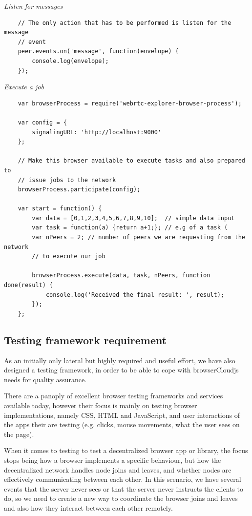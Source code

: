 \textit{Listen for messages}
\begingroup
\scriptsize
\begin{verbatim}
    // The only action that has to be performed is listen for the message 
    // event
    peer.events.on('message', function(envelope) {
        console.log(envelope);
    });
\end{verbatim}
\endgroup

\textit{Execute a job}
\begingroup
\scriptsize
\begin{verbatim}
    var browserProcess = require('webrtc-explorer-browser-process');

    var config = {
        signalingURL: 'http://localhost:9000'
    };

    // Make this browser available to execute tasks and also prepared to 
    // issue jobs to the network
    browserProcess.participate(config);

    var start = function() {
        var data = [0,1,2,3,4,5,6,7,8,9,10];  // simple data input
        var task = function(a) {return a+1;}; // e.g of a task (
        var nPeers = 2; // number of peers we are requesting from the network
        // to execute our job

        browserProcess.execute(data, task, nPeers, function done(result) {
            console.log('Received the final result: ', result);
        });
    };
\end{verbatim}
\endgroup

\subsection{Testing framework requirement}

As an initially only lateral but highly required and useful effort, we have also designed a testing framework, in order to be able to cope with browserCloudjs needs for quality assurance.

There are a panoply of excellent browser testing frameworks and services available today, however their focus is mainly on testing browser implementations, namely CSS, HTML and JavaScript, and user interactions of the apps their are testing (e.g. clicks, mouse movements, what the user sees on the page).

When it comes to testing to test a decentralized browser app or library, the focus stops being how a browser implements a specific behaviour, but how the decentralized network handles node joins and leaves, and whether nodes are effectively communicating between each other. In this scenario, we have several events that the server never sees or that the server never instructs the clients to do, so we need to create a new way to coordinate the browser joins and leaves and also how they interact between each other remotely.

